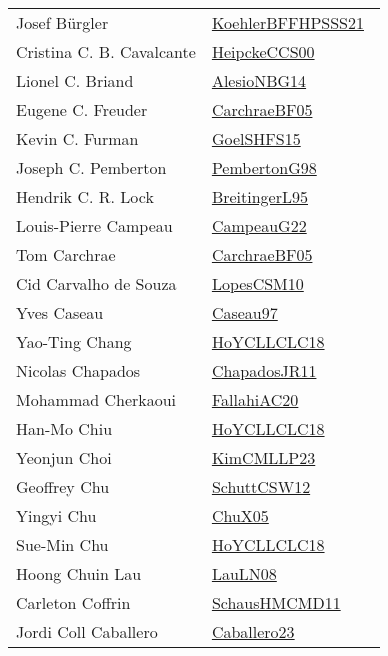 {\begin{longtable}{p{4cm}p{20cm}}
Josef B{\"{u}}rgler & \href{works/KoehlerBFFHPSSS21.pdf}{KoehlerBFFHPSSS21}~\cite{KoehlerBFFHPSSS21}\\
Cristina C. B. Cavalcante & \href{works/HeipckeCCS00.pdf}{HeipckeCCS00}~\cite{HeipckeCCS00}\\
Lionel C. Briand & \href{works/AlesioNBG14.pdf}{AlesioNBG14}~\cite{AlesioNBG14}\\
Eugene C. Freuder & \href{works/CarchraeBF05.pdf}{CarchraeBF05}~\cite{CarchraeBF05}\\
Kevin C. Furman & \href{works/GoelSHFS15.pdf}{GoelSHFS15}~\cite{GoelSHFS15}\\
Joseph C. Pemberton & \href{works/PembertonG98.pdf}{PembertonG98}~\cite{PembertonG98}\\
Hendrik C. R. Lock & \href{}{BreitingerL95}~\cite{BreitingerL95}\\
Louis{-}Pierre Campeau & \href{works/CampeauG22.pdf}{CampeauG22}~\cite{CampeauG22}\\
Tom Carchrae & \href{works/CarchraeBF05.pdf}{CarchraeBF05}~\cite{CarchraeBF05}\\
Cid Carvalho de Souza & \href{works/LopesCSM10.pdf}{LopesCSM10}~\cite{LopesCSM10}\\
Yves Caseau & \href{works/Caseau97.pdf}{Caseau97}~\cite{Caseau97}\\
Yao{-}Ting Chang & \href{works/HoYCLLCLC18.pdf}{HoYCLLCLC18}~\cite{HoYCLLCLC18}\\
Nicolas Chapados & \href{works/ChapadosJR11.pdf}{ChapadosJR11}~\cite{ChapadosJR11}\\
Mohammad Cherkaoui & \href{}{FallahiAC20}~\cite{FallahiAC20}\\
Han{-}Mo Chiu & \href{works/HoYCLLCLC18.pdf}{HoYCLLCLC18}~\cite{HoYCLLCLC18}\\
Yeonjun Choi & \href{works/KimCMLLP23.pdf}{KimCMLLP23}~\cite{KimCMLLP23}\\
Geoffrey Chu & \href{works/SchuttCSW12.pdf}{SchuttCSW12}~\cite{SchuttCSW12}\\
Yingyi Chu & \href{works/ChuX05.pdf}{ChuX05}~\cite{ChuX05}\\
Sue{-}Min Chu & \href{works/HoYCLLCLC18.pdf}{HoYCLLCLC18}~\cite{HoYCLLCLC18}\\
Hoong Chuin Lau & \href{works/LauLN08.pdf}{LauLN08}~\cite{LauLN08}\\
Carleton Coffrin & \href{works/SchausHMCMD11.pdf}{SchausHMCMD11}~\cite{SchausHMCMD11}\\
Jordi Coll Caballero & \href{works/Caballero23.pdf}{Caballero23}~\cite{Caballero23}\\

\end{longtable}}
